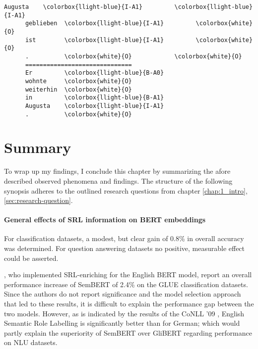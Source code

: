 {\begin{srl}[!h]
\begin{minipage}{0.45\linewidth}
\begin{BVerbatim}[commandchars=\\\{\}, fontsize=\footnotesize]
      Augusta    \colorbox{llight-blue}{I-A1}         \colorbox{llight-blue}{I-A1}
      geblieben  \colorbox{llight-blue}{I-A1}         \colorbox{white}{O}
      ist        \colorbox{llight-blue}{I-A1}         \colorbox{white}{O}
      .          \colorbox{white}{O}            \colorbox{white}{O}
      ==============================
      Er         \colorbox{llight-blue}{B-A0}
      wohnte     \colorbox{white}{O}
      weiterhin  \colorbox{white}{O}
      in         \colorbox{llight-blue}{B-A1}
      Augusta    \colorbox{llight-blue}{I-A1}
      .          \colorbox{white}{O}
    \end{BVerbatim}
  \end{minipage}
\end{srl}
\label{srl:ablation}
\endgroup


\newpage
\section{Summary}

To wrap up my findings, I conclude this chapter by summarizing the afore described observed
phenomena and findings. The structure of the following synopsis adheres to the outlined
research questions from chapter \ref{chap:1_intro}, \ref{sec:research-question}.


\paragraph*{General effects of SRL information on BERT embeddings}

For classification datasets, a modest, but clear gain of 0.8\% in overall accuracy
was determined. For question answering datasets no positive, measurable effect
could be asserted.

\cite{zhang2019semantics}, who implemented SRL-enriching for the English BERT model, report an
overall performance increase of SemBERT of 2.4\% on the GLUE classification datasets. Since the
authors do not report significance and the model selection approach that led to these results,
it is difficult to explain the performance gap between the two models. However, as is indicated
by the results of the CoNLL '09 \citep{hajivc2009conll} , English Semantic Role Labelling is
significantly better than for German; which would partly explain the superiority of SemBERT over
GliBERT regarding performance on NLU datasets.

}
